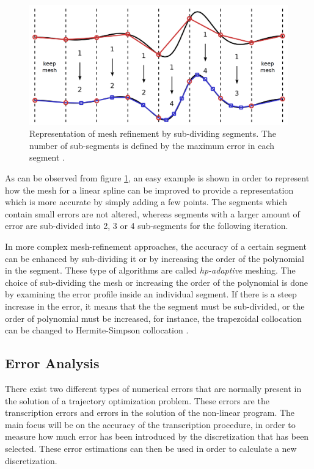 \documentclass{thesisreport}
\begin{document}
\begin{figure}[h]
\centering
\includegraphics[width=\textwidth]{Images/Trajectory/mesh_refinement}
\caption{Representation of mesh refinement by sub-dividing segments. The number of sub-segments is defined by the maximum error in each segment \cite{Kelly2017}.}
\label{mesh_refinement}
\end{figure}



As can be observed from figure \ref{mesh_refinement}, an easy example is shown in order to represent how the mesh for a linear spline can be improved to provide a representation which is more accurate by simply adding a few points. The segments which contain small errors are not altered, whereas segments with a larger amount of error are sub-divided into 2, 3 or 4 sub-segments for the following iteration.

In more complex mesh-refinement approaches, the accuracy of a certain segment can be enhanced by sub-dividing it or by increasing the order of the polynomial in the segment. These type of algorithms are called \textit{hp-adaptive} meshing. The choice of sub-dividing the mesh or increasing the order of the polynomial is done by examining the error profile inside an individual segment. If there is a steep increase in the error, it means that the the segment must be sub-divided, or the order of polynomial must be increased, for instance, the trapezoidal collocation can be changed to Hermite-Simpson collocation \cite{Kelly2017}.



\subsection{Error Analysis}

There exist two different types of numerical errors that are normally present in the solution of a trajectory optimization problem. These errors are the transcription errors and errors in the solution of the non-linear program. The main focus will be on the accuracy of the transcription procedure, in order to measure how much error has been introduced by the discretization that has been selected. These error estimations can then be used in order to calculate a new discretization. 
\end{document}

